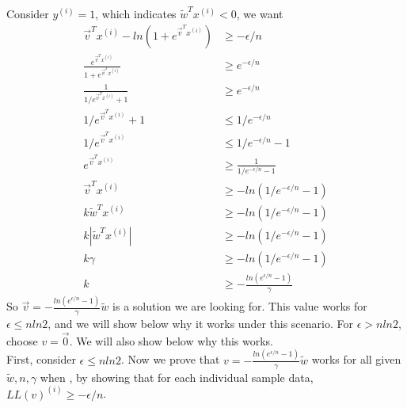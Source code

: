 \documentclass[11pt]{article}
\begin{document}
Consider $y^{(i)}=1$, which indicates $\widetilde{w}^T x^{(i)}<0$, we want 
\begin{equation}
    \begin{split}
        \Vec{v}^T x^{(i)}- ln(1+e^{\Vec{v}^T x^{(i)}}) &\geq -\epsilon / n \\
        \frac{e^{\Vec{v}^T x^{(i)}}}{1+e^{\Vec{v}^T x^{(i)}}} &\geq e^{-\epsilon / n} \\
        \frac{1}{1/e^{\Vec{v}^Tx^{(i)}} + 1} &\geq e^{-\epsilon / n} \\
        1/e^{\Vec{v}^Tx^{(i)}} + 1 &\leq 1/e^{-\epsilon / n} \\
        1/e^{\Vec{v}^Tx^{(i)}} &\leq 1/e^{-\epsilon / n} - 1 \\
        e^{\Vec{v}^Tx^{(i)}} &\geq \frac{1}{1/e^{-\epsilon / n} - 1} \\
        \Vec{v}^Tx^{(i)} &\geq -ln(1/e^{-\epsilon / n} - 1) \\
        k \widetilde{w}^T x^{(i)} &\geq -ln(1/e^{-\epsilon / n} - 1) \\
        k |\widetilde{w}^T x^{(i)}| &\geq -ln(1/e^{-\epsilon / n} - 1) \\
        k \gamma &\geq -ln(1/e^{-\epsilon / n} - 1)\\
        k &\geq -\frac{ln(e^{\epsilon / n}-1)}{\gamma}
    \end{split}
\end{equation}
So $\Vec{v} = -\frac{ln(e^{\epsilon / n}-1)}{\gamma} \widetilde{w}$ is a solution we are looking for. This value works for $\epsilon \leq nln2$, and we will show below why it works under this scenario. For $\epsilon > nln2$, choose $v=\Vec{0}$. We will also show below why this works. \\

First, consider $\epsilon\leq nln2$. Now we prove that $v=-\frac{ln(e^{\epsilon / n}-1)}{\gamma} \widetilde{w}$ works for all given $\widetilde{w},n,\gamma$ when , by showing that for each individual sample data, $LL(v)^{(i)}\geq -\epsilon /n$.\\
\end{document}
